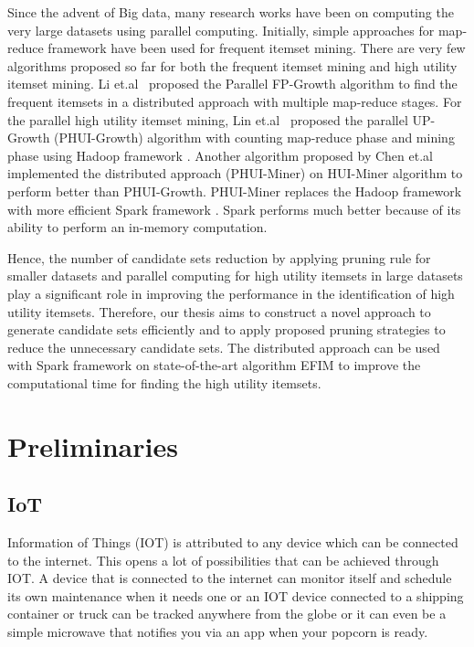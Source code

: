 \documentclass[11pt,openright]{report}
\begin{document}
Since the advent of Big data, many research works have been on computing the very large datasets using parallel computing. Initially, simple approaches for map-reduce framework have been used for frequent itemset mining\cite{Yang2010,Cryans2010}. There are very few algorithms proposed so far for both the frequent itemset mining and high utility itemset mining. Li et.al~\cite{Li2008} proposed the Parallel FP-Growth algorithm to find the frequent itemsets in a distributed approach with multiple map-reduce stages. For the parallel high utility itemset mining, Lin et.al~\cite{Lin2015} proposed the parallel UP-Growth (PHUI-Growth) algorithm with counting map-reduce phase and mining phase using Hadoop framework \cite{Dean2008}. Another algorithm proposed by Chen et.al~\cite{Chen2016} implemented the distributed approach (PHUI-Miner) on HUI-Miner algorithm \cite{Liu2012} to perform better than PHUI-Growth. PHUI-Miner replaces the Hadoop framework \cite{Dean2008} with more efficient Spark framework \cite{Zaharia2010}. Spark performs much better because of its ability to perform an in-memory computation.

Hence, the number of candidate sets reduction by applying pruning rule for smaller datasets and parallel computing for high utility itemsets in large datasets play a significant role in improving the performance in the identification of high utility itemsets. Therefore, our thesis aims to construct a novel approach to generate candidate sets efficiently and to apply proposed pruning strategies to reduce the unnecessary candidate sets. The distributed approach can be used with Spark framework on state-of-the-art algorithm EFIM \cite{Zida2015} to improve the computational time for finding the high utility itemsets.


\section{Preliminaries}\label{section:preliminaries}

\subsection{IoT}
Information of Things (IOT) is attributed to any device which can be connected to the internet. This opens a lot of possibilities that can be achieved through IOT. A device that is connected to the internet can monitor itself and schedule its own maintenance when it needs one or an IOT device connected to a shipping container or truck can be tracked anywhere from the globe or it can even be a simple microwave that notifies you via an app when your popcorn is ready.
\end{document}

